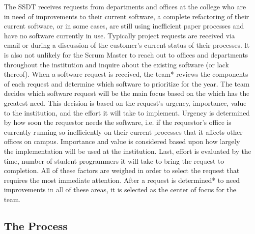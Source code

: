 The SSDT receives requests from departments and offices at the college who are in need of improvements to their current software, a complete refactoring of their current software, or in some cases, are still using inefficient paper processes and have no software currently in use. Typically project requests are received via email or during a discussion of the customer's current status of their processes. It is also not unlikely for the Scrum Master to reach out to offices and departments throughout the institution and inquire about the existing software (or lack thereof).  When a software request is received, the team* reviews the components of each request and determine which software to prioritize for the year. The team decides which software request will be the main focus based on the which has the greatest need. This decision is based on the request's urgency, importance, value to the institution, and the effort it will take to implement. Urgency is determined by how soon the requestor needs the software, i.e. if the requestor's office is currently running so inefficiently on their current processes that it affects other offices on campus. Importance and value is considered based upon how largely the implementation will be used at the institution. Last, effort is evaluated by the time, number of student programmers it will take to bring the request to completion. All of these factors are weighed in order to select the request that requires the most immediate attention. After a request is determined* to need improvements in all of these areas, it is selected as the center of focus for the team.

\subsection{The Process}

